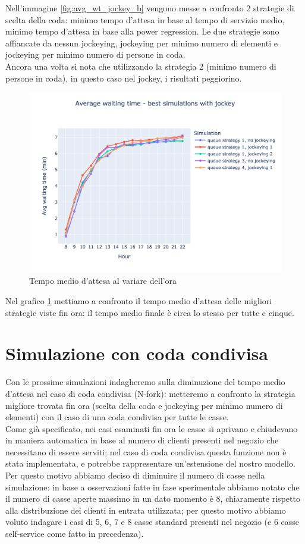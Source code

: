 Nell'immagine \ref{fig:avg_wt_jockey_b} vengono messe a confronto 2 strategie di scelta della coda: minimo tempo d'attesa in base al tempo di servizio medio, minimo tempo d'attesa in base alla power regression. Le due strategie sono affiancate da nessun jockeying, jockeying per minimo numero di elementi e jockeying per minimo numero di persone in coda. \\
Ancora una volta si nota che utilizzando la strategia 2 (minimo numero
di persone in coda), in questo caso nel jockey, i risultati
peggiorino.

\begin{figure}[H]
	\centering
	\includegraphics[width=12cm]{"images/results/avg_wt_jockey_best.png"}
	\caption{Tempo medio d'attesa al variare dell'ora}
	\label{fig:avg_wt_jockey_best}
\end{figure}

Nel grafico \ref{fig:avg_wt_jockey_best} mettiamo a confronto il tempo medio d'attesa delle migliori strategie viste fin ora: il tempo medio finale è circa lo stesso per tutte e cinque.

\section{Simulazione con coda condivisa}

Con le prossime simulazioni indagheremo sulla diminuzione del tempo medio d'attesa nel caso di coda condivisa (N-fork): metteremo a confronto la strategia migliore trovata fin ora (scelta della coda e jockeying per minimo numero di elementi) con il caso di una coda condivisa per tutte le casse. \\
Come già specificato, nei casi esaminati fin ora le casse si aprivano
e chiudevano in maniera automatica in base al numero di clienti
presenti nel negozio che necessitano di essere serviti; nel caso di
coda condivisa questa funzione non è stata implementata, e potrebbe
rappresentare un'estensione del nostro modello. Per questo motivo
abbiamo deciso di diminuire il numero di casse nella simulazione: in
base a osservazioni fatte in fase sperimentale abbiamo notato che il
numero di casse aperte massimo in un dato momento è 8, chiaramente
rispetto alla distribuzione dei clienti in entrata utilizzata; per
questo motivo abbiamo voluto indagare i casi di 5, 6, 7 e 8 casse
standard presenti nel negozio (e 6 casse self-service come fatto in
precedenza).

